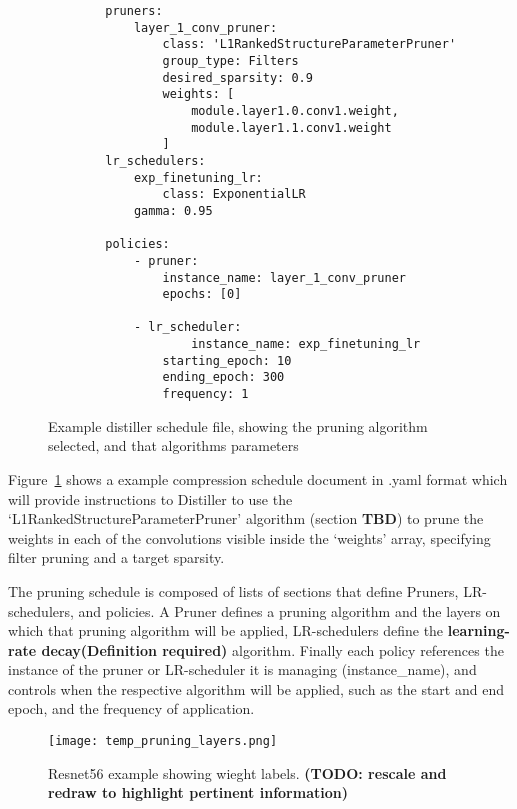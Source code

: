 \documentclass[../Dissertation.tex]{subfiles}
\begin{document}
\singlespacing
\begin{figure}[H]
    \begin{verbatim}
        pruners: 
            layer_1_conv_pruner:
                class: 'L1RankedStructureParameterPruner'
                group_type: Filters
                desired_sparsity: 0.9
                weights: [
                    module.layer1.0.conv1.weight,
                    module.layer1.1.conv1.weight
                ]
        lr_schedulers:
            exp_finetuning_lr:
                class: ExponentialLR
            gamma: 0.95

        policies:
            - pruner:
                instance_name: layer_1_conv_pruner
                epochs: [0]
            
            - lr_scheduler:
                    instance_name: exp_finetuning_lr
                starting_epoch: 10
                ending_epoch: 300
                frequency: 1
    \end{verbatim}
    \caption{Example distiller schedule file, showing the pruning algorithm selected, and that algorithms parameters}
    \label{fig:CompressionSchedule}
\end{figure}
\doublespacing

Figure~\ref{fig:CompressionSchedule} shows a example compression schedule document in .yaml format which will provide instructions to Distiller to use the `L1RankedStructureParameterPruner' algorithm (section \textbf{TBD}) to prune the weights in each of the convolutions visible inside the `weights' array, specifying filter pruning and a target sparsity.

The pruning schedule is composed of lists of sections that define Pruners, LR-schedulers, and policies. A Pruner defines a pruning algorithm and the layers on which that pruning algorithm will be applied, LR-schedulers define the \textbf{learning-rate decay(Definition required)} algorithm. 
Finally each policy references the instance of the pruner or LR-scheduler it is managing (instance\_name), and controls when the respective algorithm will be applied, such as the start and end epoch, and the frequency of application.

\begin{figure}[H]
    \texttt{[image: temp\_pruning\_layers.png]}
    \caption{Resnet56 example showing wieght labels. \textbf{(TODO: rescale and redraw to highlight pertinent information)}}
    \label{fig:resnet56weightlabels}
\end{figure}
\end{document}
